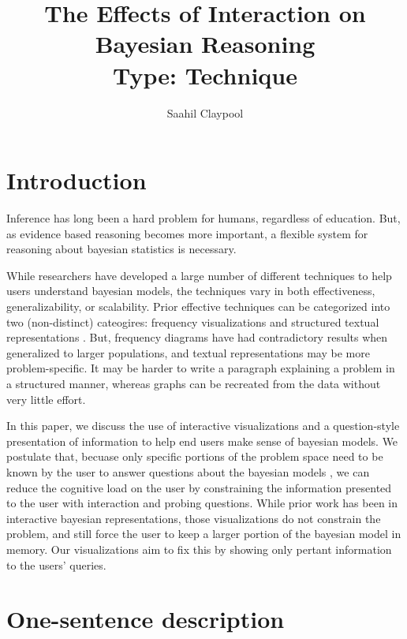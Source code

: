 \documentclass{proc}
\begin{document}
\title{%
    The Effects of Interaction on Bayesian Reasoning \\
    \large Type: Technique
}

\author{Saahil Claypool}

\maketitle

\section{Introduction}

Inference has long been a hard problem for humans, 
regardless of education. But, as evidence based reasoning becomes more
important, a flexible system for reasoning about bayesian statistics is 
necessary. 

While researchers have developed a large number of different techniques to 
help users understand bayesian models, the techniques vary in both effectiveness,
generalizability, or scalability. Prior effective techniques can be categorized into two (non-distinct) cateogires: 
frequency visualizations and structured textual representations \cite{Ottley2016}. But, frequency diagrams
have had contradictory results when generalized to larger populations, and textual representations
may be more problem-specific. It may be harder to write a paragraph explaining a problem in a structured manner, whereas
graphs can be recreated from the data without very little effort. 

In this paper, we discuss the use of interactive visualizations and a question-style
presentation of information to help end users make sense of bayesian models. We postulate that, 
becuase only specific portions of the problem space need to be known by the user to answer 
questions about the bayesian models \cite{Gigerenzer1995}, we can reduce the cognitive load on the user by 
constraining the information presented to the user with interaction and probing questions. While prior work has been 
in interactive bayesian representations, those visualizations do not constrain the problem, and still
force the user to keep a larger portion of the bayesian model in memory. Our visualizations aim to fix this by 
showing only pertant information to the users' queries. 



\section{One-sentence description}
\end{document}
